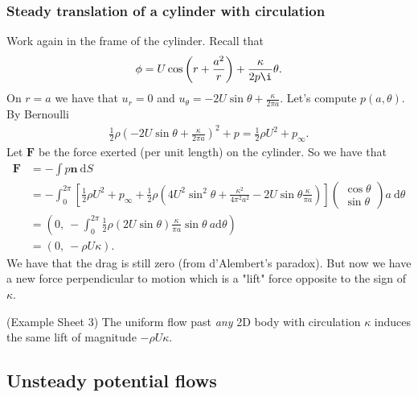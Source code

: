 \documentclass{article}
\begin{document}
\subsubsection{Steady translation of a cylinder with circulation}
Work again in the frame of the cylinder. Recall that
\[
	\phi = U \cos\left(r + \frac {a^2}r \right) + \frac\kappa{2p\i} \theta.
\]
On $ r=a $ we have that $ u_r = 0 $ and $ u_\theta = -2U \sin\theta + \frac\kappa{2\pi a} $. Let's compute $ p(a,\theta) $. By Bernoulli 
\begin{align*}
	\frac 12 \rho \left(-2U\sin\theta + \frac\kappa{2\pi a}\right)^2 + p = \frac 12 \rho U^2 +p_\infty.
\end{align*}
Let $ \mathbf F $ be the force exerted (per unit length) on the cylinder. So we have that
\begin{align*}
	\mathbf F &= - \int p\mathbf n \ \mathrm d S \\
		  &= -\int_0^{2\pi} \left[\frac 12 \rho U^2 + p_\infty +\frac 12 \rho\left(4U^2\sin^2\theta + \frac{\kappa^2}{4\pi ^2a^2} - 2U\sin\theta\frac{\kappa}{\pi a}\right)\right]\begin{pmatrix}
		    \cos\theta \\
		    \sin\theta
		  \end{pmatrix}a\ \mathrm d\theta \\
		  &= \left(0,\  -\int_0^{2\pi} \frac 12 \rho(2U \sin\theta)\frac\kappa{\pi a} \sin\theta\ a\mathrm d\theta\right)\\
		  &= \left(0, \ -\rho U\kappa\right).
\end{align*}
We have that the drag is still zero (from d'Alembert's paradox). But now we have a new force perpendicular to motion which is a "lift" force opposite to the sign of $ \kappa $.
\par
(Example Sheet 3) The uniform flow past \textit{any} 2D body with circulation $ \kappa $ induces the same lift of magnitude $ -\rho U \kappa $. 
\subsection{Unsteady potential flows}
\end{document}
